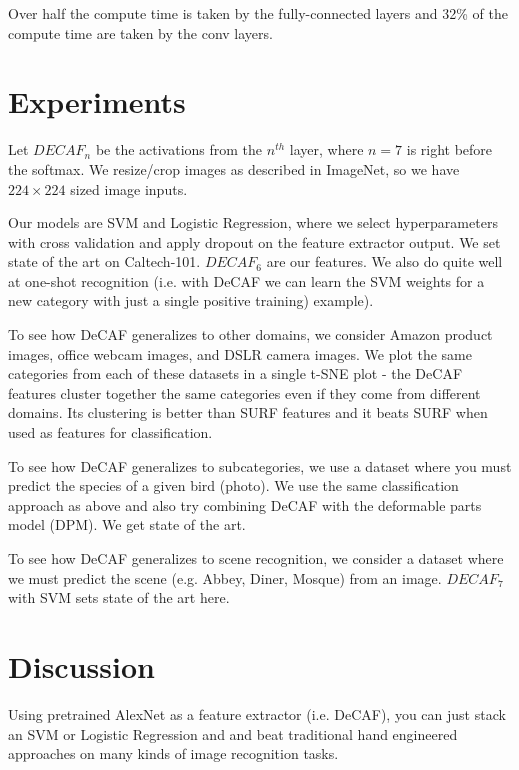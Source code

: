 \documentclass[a4paper]{article}
\begin{document}
Over half the compute time is taken by the fully-connected layers and 32\%
of the compute time are taken by the conv layers.

\section{Experiments}
Let $DECAF_n$ be the activations from the $n^{th}$ layer, where $n=7$ is
right before the softmax. We resize/crop images as described in ImageNet,
so we have $224 \times 224$ sized image inputs.

Our models are SVM and Logistic Regression, where we select hyperparameters
with cross validation and apply dropout on the feature extractor output.
We set state of the art on Caltech-101. $DECAF_{6}$ are our features. We
also do quite well at one-shot recognition (i.e. with DeCAF we can learn
the SVM weights for a new category with just a single positive training)
example).

To see how DeCAF generalizes to other domains, we consider Amazon product
images, office webcam images, and DSLR camera images. We plot the same
categories from each of these datasets in a single t-SNE plot - the
DeCAF features cluster together the same categories even if they come from
different domains. Its clustering is better than SURF features and it beats
SURF when used as features for classification.

To see how DeCAF generalizes to subcategories, we use a dataset where you
must predict the species of a given bird (photo). We use the same classification
approach as above and also try combining DeCAF with the deformable parts model
(DPM). We get state of the art.

To see how DeCAF generalizes to scene recognition, we consider a dataset where
we must predict the scene (e.g. Abbey, Diner, Mosque) from an image. $DECAF_7$
with SVM sets state of the art here.

\section{Discussion}
Using pretrained AlexNet as a feature extractor (i.e. DeCAF), you can just
stack an SVM or Logistic Regression and and beat traditional hand engineered
approaches on many kinds of image recognition tasks.
\end{document}
